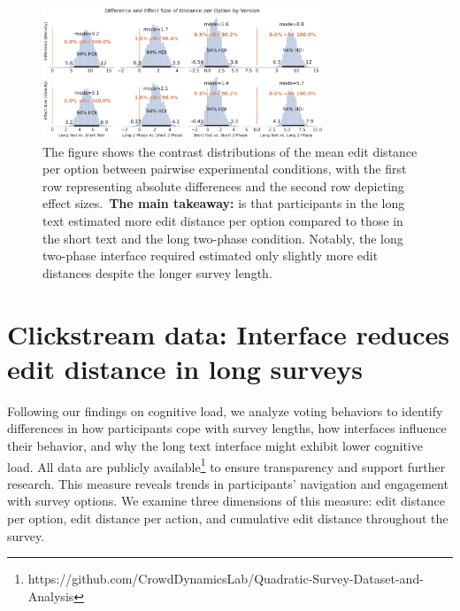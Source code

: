 \begin{figure}[t!]
    \centering
    \includegraphics[width=0.75\textwidth]{content/image/distance/distance_diff_per_option_effect_size_by_version.pdf}
    \caption{The figure shows the contrast distributions of the mean edit distance per option between pairwise experimental conditions, with the first row representing absolute differences and the second row depicting effect sizes.~\textbf{The main takeaway:} is that participants in the long text estimated more edit distance per option compared to those in the short text and the long two-phase condition. Notably, the long two-phase interface required estimated only slightly more edit distances despite the longer survey length.}
    \label{fig:dist_per_option_bayesian}
\end{figure}

\section{Clickstream data: Interface reduces edit distance in long surveys}
\label{sec:dist}
Following our findings on cognitive load, we analyze voting behaviors to identify differences in how participants cope with survey lengths, how interfaces influence their behavior, and why the long text interface might exhibit lower cognitive load. All data are publicly available\footnote{https://github.com/CrowdDynamicsLab/Quadratic-Survey-Dataset-and-Analysis} to ensure transparency and support further research. This measure reveals trends in participants' navigation and engagement with survey options. We examine three dimensions of this measure: edit distance per option, edit distance per action, and cumulative edit distance throughout the survey.

